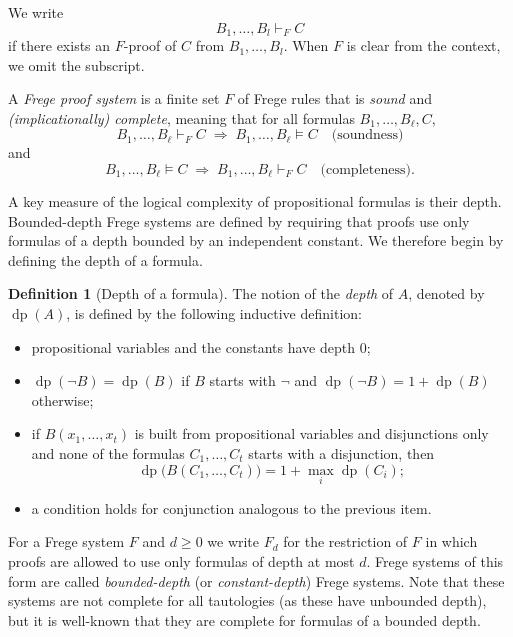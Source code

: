 \documentclass{article}
\theoremstyle{plain}
\theoremstyle{definition}
\newtheorem{definition}[theorem]{Definition}
\begin{document}
We write
\[
B_1,\dots,B_l \vdash_F C
\]
if there exists an $F$-proof of $C$ from $B_1,\dots,B_l$. When $F$ is clear from the
context, we omit the subscript.

\medskip

A \emph{Frege proof system} is a finite set $F$ of Frege rules that is
\emph{sound} and \emph{(implicationally) complete}, meaning that for all formulas
$B_1,\dots,B_\ell,C$,
\[
B_1,\dots,B_\ell \vdash_F C \;\Rightarrow\; B_1,\dots,B_\ell \models C
\quad\text{(soundness)}
\]
and
\[
B_1,\dots,B_\ell \models C \;\Rightarrow\; B_1,\dots,B_\ell \vdash_F C
\quad\text{(completeness)}.
\]


A key measure of the logical complexity of propositional formulas is their depth.
Bounded-depth Frege systems are defined by requiring that proofs use only formulas of a depth bounded by an independent constant. We therefore begin by defining the depth of a formula.

\begin{definition}[Depth of a formula]
    The notion of the \emph{depth} of $A$, denoted by $\operatorname{dp}(A)$, is defined by the following inductive definition:
\begin{itemize}
    \item propositional variables and the constants have depth $0$;
    \item $\operatorname{dp}(\lnot B) = \operatorname{dp}(B)$ if $B$ starts with $\lnot$ and $\operatorname{dp}(\lnot B) = 1 + \operatorname{dp}(B)$ otherwise;
    \item if $B(x_1,\ldots,x_t)$ is built from propositional variables and disjunctions only and none of the formulas
    $C_1,\ldots,C_t$ starts with a disjunction, then
    \[
        \operatorname{dp}\!\bigl(B(C_1,\ldots,C_t)\bigr)
        = 1 + \max_i \operatorname{dp}(C_i);
    \]
    \item a condition holds for conjunction analogous to the previous item.
\end{itemize}
\end{definition}




For a Frege system $F$ and $d \ge 0$ we write $F_d$ for the restriction of $F$ in which proofs are allowed to use only formulas of depth at most $d$. Frege systems of this form are called \emph{bounded-depth} (or \emph{constant-depth}) Frege systems. Note that these systems are not complete for all tautologies (as these have unbounded depth), but it is well-known that they are complete for formulas of a bounded depth.
\end{document}
